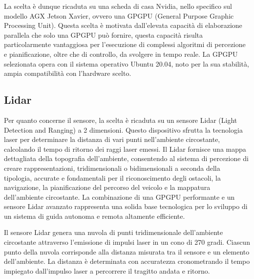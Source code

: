 \noindent La scelta è dunque ricaduta su una scheda di casa Nvidia, nello specifico sul modello AGX Jetson Xavier, ovvero una GPGPU (General Purpose Graphic Processing Unit). Questa scelta è motivata dall'elevata capacità di elaborazione parallela che solo una GPGPU può fornire, questa capacità risulta particolarmente vantaggiosa per l'esecuzione di complessi algoritmi di percezione e pianificazione, oltre che di controllo, da svolgere in tempo reale. La GPGPU selezionata opera con il sistema operativo Ubuntu 20.04, noto per la sua stabilità, ampia compatibilità con l'hardware scelto.

\subsection{Lidar}
Per quanto concerne il sensore, la scelta è ricaduta su un sensore Lidar (Light Detection and Ranging) a 2 dimensioni. Questo dispositivo sfrutta la tecnologia laser per determinare la distanza di vari punti nell'ambiente circostante, calcolando il tempo di ritorno dei raggi laser emessi. Il Lidar fornisce una mappa dettagliata della topografia dell'ambiente, consentendo al sistema di percezione di creare rappresentazioni, tridimensionali o bidimensionali a seconda della tipologia, accurate e fondamentali per il riconoscimento degli ostacoli, la navigazione, la pianificazione del percorso del veicolo e la mappatura dell'ambiente circostante. La combinazione di una GPGPU performante e un sensore Lidar avanzato rappresenta una solida base tecnologica per lo sviluppo di un sistema di guida autonoma e remota altamente efficiente.

\noindent Il sensore Lidar genera una nuvola di punti tridimensionale dell'ambiente circostante attraverso l'emissione di impulsi laser in un cono di 270 gradi. Ciascun punto della nuvola corrisponde alla distanza misurata tra il sensore e un elemento dell'ambiente. La distanza è determinata con accuratezza cronometrando il tempo impiegato dall'impulso laser a percorrere il tragitto andata e ritorno.
